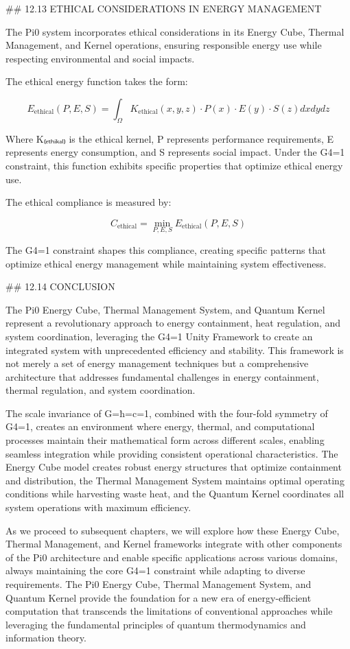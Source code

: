 ## 12.13 ETHICAL CONSIDERATIONS IN ENERGY MANAGEMENT

The Pi0 system incorporates ethical considerations in its Energy Cube, Thermal Management, and Kernel operations, ensuring responsible energy use while respecting environmental and social impacts.

The ethical energy function takes the form:

$$E_{\text{ethical}}(P, E, S) = \int_{\Omega} K_{\text{ethical}}(x, y, z) \cdot P(x) \cdot E(y) \cdot S(z) dx dy dz$$

Where K₍ₑₜₕᵢₖₐₗ₎ is the ethical kernel, P represents performance requirements, E represents energy consumption, and S represents social impact. Under the G4=1 constraint, this function exhibits specific properties that optimize ethical energy use.

The ethical compliance is measured by:

$$C_{\text{ethical}} = \min_{P, E, S} E_{\text{ethical}}(P, E, S)$$

The G4=1 constraint shapes this compliance, creating specific patterns that optimize ethical energy management while maintaining system effectiveness.

## 12.14 CONCLUSION

The Pi0 Energy Cube, Thermal Management System, and Quantum Kernel represent a revolutionary approach to energy containment, heat regulation, and system coordination, leveraging the G4=1 Unity Framework to create an integrated system with unprecedented efficiency and stability. This framework is not merely a set of energy management techniques but a comprehensive architecture that addresses fundamental challenges in energy containment, thermal regulation, and system coordination.

The scale invariance of G=ħ=c=1, combined with the four-fold symmetry of G4=1, creates an environment where energy, thermal, and computational processes maintain their mathematical form across different scales, enabling seamless integration while providing consistent operational characteristics. The Energy Cube model creates robust energy structures that optimize containment and distribution, the Thermal Management System maintains optimal operating conditions while harvesting waste heat, and the Quantum Kernel coordinates all system operations with maximum efficiency.

As we proceed to subsequent chapters, we will explore how these Energy Cube, Thermal Management, and Kernel frameworks integrate with other components of the Pi0 architecture and enable specific applications across various domains, always maintaining the core G4=1 constraint while adapting to diverse requirements. The Pi0 Energy Cube, Thermal Management System, and Quantum Kernel provide the foundation for a new era of energy-efficient computation that transcends the limitations of conventional approaches while leveraging the fundamental principles of quantum thermodynamics and information theory.

